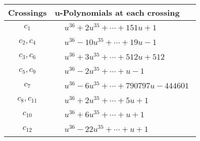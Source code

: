 \documentclass[1p]{elsarticle_modified}
\theoremstyle{definition}
\begin{document}
\begin{tabular}{m{50pt}|m{274pt}}
Crossings & \hspace{64pt}u-Polynomials at each crossing \\
\hline $$\begin{aligned}c_{1}\end{aligned}$$&$\begin{aligned}
&u^{36}+2 u^{35}+\cdots+151 u+1
\end{aligned}$\\
\hline $$\begin{aligned}c_{2},c_{4}\end{aligned}$$&$\begin{aligned}
&u^{36}-10 u^{35}+\cdots+19 u-1
\end{aligned}$\\
\hline $$\begin{aligned}c_{3},c_{6}\end{aligned}$$&$\begin{aligned}
&u^{36}+3 u^{35}+\cdots+512 u+512
\end{aligned}$\\
\hline $$\begin{aligned}c_{5},c_{9}\end{aligned}$$&$\begin{aligned}
&u^{36}-2 u^{35}+\cdots+u-1
\end{aligned}$\\
\hline $$\begin{aligned}c_{7}\end{aligned}$$&$\begin{aligned}
&u^{36}-6 u^{35}+\cdots+790797 u-444601
\end{aligned}$\\
\hline $$\begin{aligned}c_{8},c_{11}\end{aligned}$$&$\begin{aligned}
&u^{36}+2 u^{35}+\cdots+5 u+1
\end{aligned}$\\
\hline $$\begin{aligned}c_{10}\end{aligned}$$&$\begin{aligned}
&u^{36}+6 u^{35}+\cdots+u+1
\end{aligned}$\\
\hline $$\begin{aligned}c_{12}\end{aligned}$$&$\begin{aligned}
&u^{36}-22 u^{35}+\cdots+u+1
\end{aligned}$\\
\hline
\end{tabular}\\~\\
\end{document}

